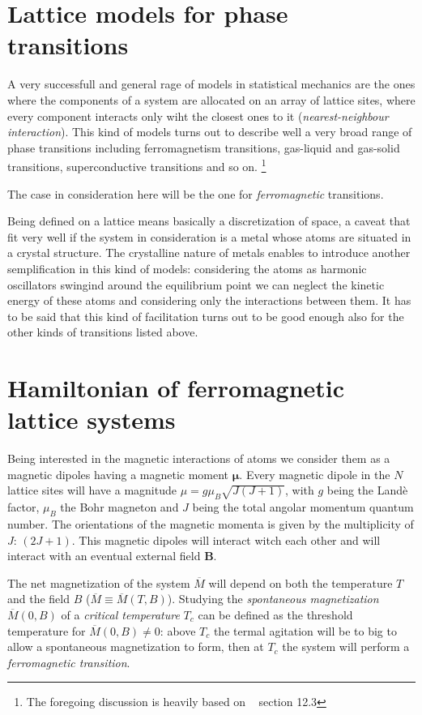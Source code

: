 \section{Lattice models for phase transitions}

A very successfull and general rage of  models in statistical mechanics are the
ones where the components of a system are allocated on an array of lattice sites,
where every component interacts only wiht the closest ones to it 
(\emph{nearest-neighbour interaction}).
This kind of models turns out to describe well a very broad range of phase 
transitions including ferromagnetism transitions, gas-liquid and gas-solid 
transitions, superconductive transitions and so on. \footnote{The foregoing
discussion is heavily based on ~\textcite{pathria1972statistical} section 12.3}

The case in consideration here will be the one for \emph{ferromagnetic}
transitions.

Being defined on a lattice means basically a discretization of space, a caveat 
that fit very well if the system in consideration is a metal whose atoms are 
situated in a crystal structure. The crystalline nature of metals enables to
introduce another semplification in this kind of models: considering the atoms
as harmonic oscillators swingind around the equilibrium point we can neglect the
kinetic energy of these atoms and considering only the interactions between them.
It has to be said that this kind of facilitation turns out to be good enough also
for the other kinds of transitions listed above.

\section{Hamiltonian of ferromagnetic lattice systems}

Being interested in the magnetic interactions of atoms we consider them as a 
magnetic dipoles having a magnetic moment $\mathbf{\mu}$. Every magnetic dipole
in the $N$ lattice sites will have a magnitude $\mu = g \mu_B \sqrt{J(J+1)}$, 
with $g$ being the Landè factor, $\mu_B$ the Bohr magneton and $J$ being the
total angolar momentum quantum number. The orientations of the magnetic momenta
is given by the multiplicity of $J$: $(2J+1)$. This magnetic dipoles will interact
witch each other and will interact with an eventual external field $\mathbf{B}$.

The net magnetization of the system $\overline{M}$ will depend on both the 
temperature $T$ and the field $B$ ($\overline{M} \equiv \overline{M}(T,B)$). 
Studying the \emph{spontaneous magnetization} $\overline{M}(0,B)$ of
a \emph{critical temperature} $T_c$ can be defined as the threshold temperature
for $\overline{M}(0,B) \neq 0$: above $T_c$ the termal agitation will be to
big to allow a spontaneous magnetization to form, then at $T_c$ the system will
perform a \emph{ferromagnetic transition}.

